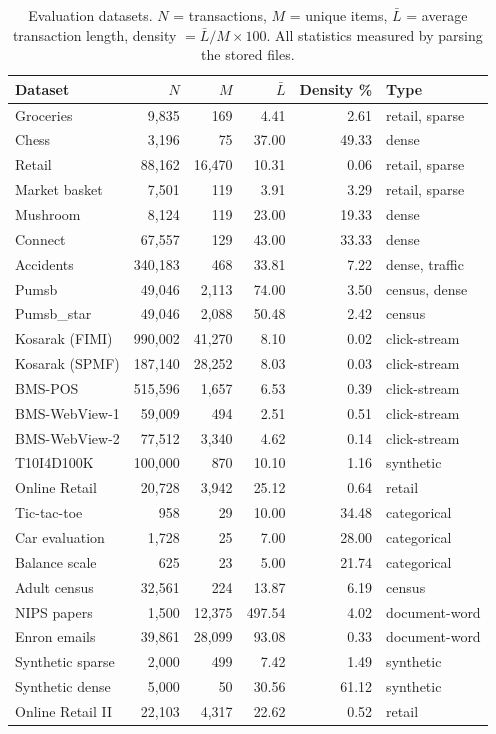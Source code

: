 \documentclass[twocolumn,10pt]{article}
\begin{document}
\begin{table}[t]
\centering
\footnotesize
\caption{Evaluation datasets. $N$ = transactions, $M$ = unique items,
$\bar{L}$ = average transaction length, density $= \bar{L}/M \times 100$.
All statistics measured by parsing the stored files.}
\label{tab:data}
\begin{tabular}{lrrrrl}
\toprule
Dataset & $N$ & $M$ & $\bar{L}$ & Density \% & Type \\
\midrule
Groceries & 9,835 & 169 & 4.41 & 2.61 & retail, sparse \\
Chess & 3,196 & 75 & 37.00 & 49.33 & dense \\
Retail & 88,162 & 16,470 & 10.31 & 0.06 & retail, sparse \\
Market basket & 7,501 & 119 & 3.91 & 3.29 & retail, sparse \\
Mushroom & 8,124 & 119 & 23.00 & 19.33 & dense \\
Connect & 67,557 & 129 & 43.00 & 33.33 & dense \\
Accidents & 340,183 & 468 & 33.81 & 7.22 & dense, traffic \\
Pumsb & 49,046 & 2,113 & 74.00 & 3.50 & census, dense \\
Pumsb\_star & 49,046 & 2,088 & 50.48 & 2.42 & census \\
Kosarak (FIMI) & 990,002 & 41,270 & 8.10 & 0.02 & click-stream \\
Kosarak (SPMF) & 187,140 & 28,252 & 8.03 & 0.03 & click-stream \\
BMS-POS & 515,596 & 1,657 & 6.53 & 0.39 & click-stream \\
BMS-WebView-1 & 59,009 & 494 & 2.51 & 0.51 & click-stream \\
BMS-WebView-2 & 77,512 & 3,340 & 4.62 & 0.14 & click-stream \\
T10I4D100K & 100,000 & 870 & 10.10 & 1.16 & synthetic \\
Online Retail & 20,728 & 3,942 & 25.12 & 0.64 & retail \\
Tic-tac-toe & 958 & 29 & 10.00 & 34.48 & categorical \\
Car evaluation & 1,728 & 25 & 7.00 & 28.00 & categorical \\
Balance scale & 625 & 23 & 5.00 & 21.74 & categorical \\
Adult census & 32,561 & 224 & 13.87 & 6.19 & census \\
NIPS papers & 1,500 & 12,375 & 497.54 & 4.02 & document-word \\
Enron emails & 39,861 & 28,099 & 93.08 & 0.33 & document-word \\
Synthetic sparse & 2,000 & 499 & 7.42 & 1.49 & synthetic \\
Synthetic dense & 5,000 & 50 & 30.56 & 61.12 & synthetic \\
Online Retail II & 22,103 & 4,317 & 22.62 & 0.52 & retail \\
\bottomrule
\end{tabular}
\end{table}
\end{document}
